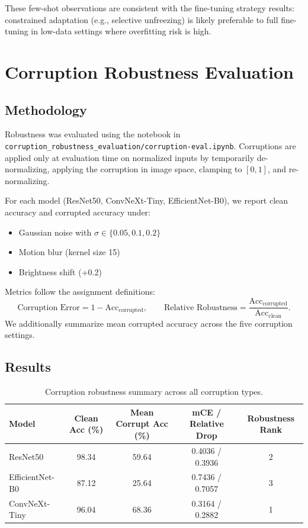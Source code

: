\documentclass[11pt,a4paper]{article}
\begin{document}
These few-shot observations are consistent with the fine-tuning strategy results: constrained adaptation (e.g., selective unfreezing) is likely preferable to full fine-tuning in low-data settings where overfitting risk is high.

\section{Corruption Robustness Evaluation}
\subsection{Methodology}
Robustness was evaluated using the notebook in \texttt{corruption\_robustness\_evaluation/corruption-eval.ipynb}. Corruptions are applied only at evaluation time on normalized inputs by temporarily de-normalizing, applying the corruption in image space, clamping to $[0,1]$, and re-normalizing.

For each model (ResNet50, ConvNeXt-Tiny, EfficientNet-B0), we report clean accuracy and corrupted accuracy under:
\begin{itemize}
	\item Gaussian noise with $\sigma\in\{0.05,0.1,0.2\}$
	\item Motion blur (kernel size 15)
	\item Brightness shift (+0.2)
\end{itemize}

Metrics follow the assignment definitions:
\[
\text{Corruption Error} = 1 - \mathrm{Acc}_{\text{corrupted}}, \qquad
\text{Relative Robustness} = \frac{\mathrm{Acc}_{\text{corrupted}}}{\mathrm{Acc}_{\text{clean}}}.
\]
We additionally summarize mean corrupted accuracy across the five corruption settings.

\subsection{Results}
\begin{table}[H]
	\centering
	\caption{Corruption robustness summary across all corruption types.}
	\begin{tabular}{lcccc}
		\toprule
		Model & Clean Acc (\%) & Mean Corrupt Acc (\%) & mCE / Relative Drop & Robustness Rank \\
		\midrule
		ResNet50 & 98.34 & 59.64 & 0.4036 / 0.3936 & 2 \\
		EfficientNet-B0 & 87.12 & 25.64 & 0.7436 / 0.7057 & 3 \\
		ConvNeXt-Tiny & 96.04 & 68.36 & 0.3164 / 0.2882 & 1 \\
		\bottomrule
	\end{tabular}
\end{table}
\end{document}
